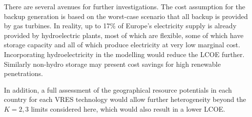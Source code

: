 \documentclass[a4paper, 5p, sort&compress]{elsarticle}%
\begin{document}

There are several avenues for further investigations. The cost assumption for the backup generation is based on the
worst-case scenario that all backup is provided by gas turbines. In
reality, up to 17\% of Europe's electricity supply is already provided
by hydroelectric plants, most of which are flexible, some of which
have storage capacity and all of which produce electricity at very low
marginal cost. Incorporating hydroelectricity in the modelling would
reduce the LCOE further. Similarly non-hydro storage may present cost
savings for high renewable penetrations.

In addition, a full assessment of the geographical resource potentials
in each country for each VRES technology would allow further
heterogeneity beyond the $K=2,3$ limits considered here, which would
also result in a lower LCOE.





\end{document}
